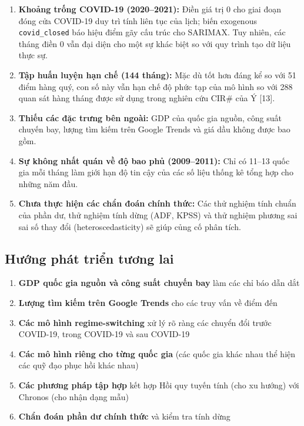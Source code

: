 \documentclass[
]{article}
\providecommand{\tightlist}{%
  \setlength{\itemsep}{0pt}\setlength{\parskip}{0pt}}
\begin{document}
\begin{enumerate}
\def\labelenumi{\arabic{enumi}.}
\tightlist
\item
  \textbf{Khoảng trống COVID-19 (2020--2021):} Điền giá trị 0 cho giai
  đoạn đóng cửa COVID-19 duy trì tính liên tục của lịch; biến exogenous
  \texttt{covid\_closed} báo hiệu điểm gãy cấu trúc cho SARIMAX. Tuy
  nhiên, các tháng điền 0 vẫn đại diện cho một sự khác biệt so với quy
  trình tạo dữ liệu thực sự.
\item
  \textbf{Tập huấn luyện hạn chế (144 tháng):} Mặc dù tốt hơn đáng kể so
  với 51 điểm hàng quý, con số này vẫn hạn chế độ phức tạp của mô hình
  so với 288 quan sát hàng tháng được sử dụng trong nghiên cứu CIR\# của
  Ý {[}13{]}.
\item
  \textbf{Thiếu các đặc trưng bên ngoài:} GDP của quốc gia nguồn, công
  suất chuyến bay, lượng tìm kiếm trên Google Trends và giá dầu không
  được bao gồm.
\item
  \textbf{Sự không nhất quán về độ bao phủ (2009--2011):} Chỉ có 11--13
  quốc gia mỗi tháng làm giới hạn độ tin cậy của các số liệu thống kê
  tổng hợp cho những năm đầu.
\item
  \textbf{Chưa thực hiện các chẩn đoán chính thức:} Các thử nghiệm tính
  chuẩn của phần dư, thử nghiệm tính dừng (ADF, KPSS) và thử nghiệm
  phương sai sai số thay đổi (heteroscedasticity) sẽ giúp củng cố phân
  tích.
\end{enumerate}

\subsection{Hướng phát triển tương
lai}\label{hux1b0ux1edbng-phuxe1t-triux1ec3n-tux1b0ux1a1ng-lai}

\begin{enumerate}
\def\labelenumi{\arabic{enumi}.}
\tightlist
\item
  \textbf{GDP quốc gia nguồn và công suất chuyến bay} làm các chỉ báo
  dẫn dắt
\item
  \textbf{Lượng tìm kiếm trên Google Trends} cho các truy vấn về điểm
  đến
\item
  \textbf{Các mô hình regime-switching} xử lý rõ ràng các chuyển đổi
  trước COVID-19, trong COVID-19 và sau COVID-19
\item
  \textbf{Các mô hình riêng cho từng quốc gia} (các quốc gia khác nhau
  thể hiện các quỹ đạo phục hồi khác nhau)
\item
  \textbf{Các phương pháp tập hợp} kết hợp Hồi quy tuyến tính (cho xu
  hướng) với Chronos (cho nhận dạng mẫu)
\item
  \textbf{Chẩn đoán phần dư chính thức} và kiểm tra tính dừng
\end{enumerate}
\end{document}
